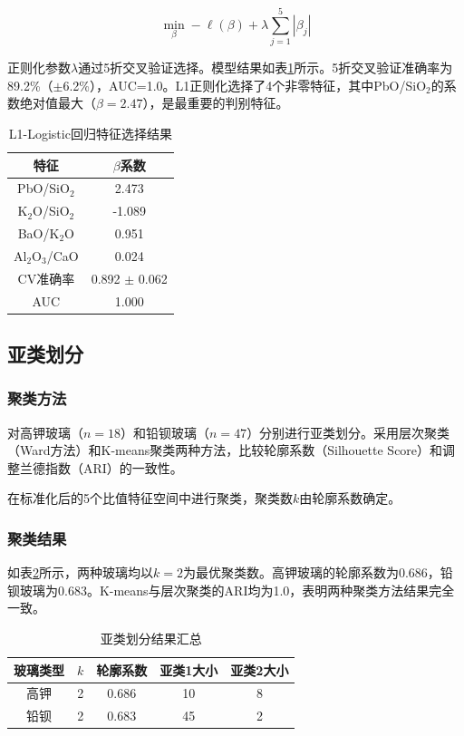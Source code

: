 \documentclass[fontset=windows, 12pt, a4paper]{ctexart}
\begin{document}
\begin{equation}
\min_{\beta} -\ell(\beta) + \lambda \sum_{j=1}^{5} |\beta_j|
\end{equation}

正则化参数$\lambda$通过5折交叉验证选择。模型结果如表\ref{tab:l1lr}所示。5折交叉验证准确率为89.2\%（$\pm$6.2\%），AUC=1.0。L1正则化选择了4个非零特征，其中PbO/SiO$_2$的系数绝对值最大（$\beta=2.47$），是最重要的判别特征。

\begin{table}[H]
\centering
\caption{L1-Logistic回归特征选择结果}
\label{tab:l1lr}
\begin{tabular}{c|c}
\toprule
\textbf{特征} & $\beta$系数 \\
\midrule
PbO/SiO$_2$      & 2.473 \\
K$_2$O/SiO$_2$   & -1.089 \\
BaO/K$_2$O       & 0.951 \\
Al$_2$O$_3$/CaO  & 0.024 \\
\midrule
CV准确率 & 0.892 $\pm$ 0.062 \\
AUC      & 1.000 \\
\bottomrule
\end{tabular}
\end{table}

\subsection{亚类划分}

\subsubsection{聚类方法}

对高钾玻璃（$n=18$）和铅钡玻璃（$n=47$）分别进行亚类划分。采用层次聚类（Ward方法）和K-means聚类两种方法，比较轮廓系数（Silhouette Score）和调整兰德指数（ARI）的一致性。

在标准化后的5个比值特征空间中进行聚类，聚类数$k$由轮廓系数确定。

\subsubsection{聚类结果}

如表\ref{tab:subclass}所示，两种玻璃均以$k=2$为最优聚类数。高钾玻璃的轮廓系数为0.686，铅钡玻璃为0.683。K-means与层次聚类的ARI均为1.0，表明两种聚类方法结果完全一致。

\begin{table}[H]
\centering
\caption{亚类划分结果汇总}
\label{tab:subclass}
\begin{tabular}{c|c|c|c|c}
\toprule
\textbf{玻璃类型} & $k$ & \textbf{轮廓系数} & \textbf{亚类1大小} & \textbf{亚类2大小} \\
\midrule
高钾 & 2 & 0.686 & 10 & 8 \\
铅钡 & 2 & 0.683 & 45 & 2 \\
\bottomrule
\end{tabular}
\end{table}
\end{document}
